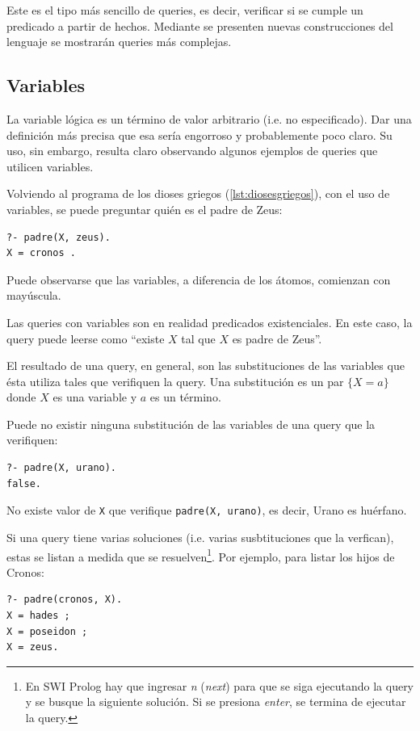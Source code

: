 \documentclass[12pt,titlepage]{article}
\begin{document}
Este es el tipo más sencillo de queries, es decir, verificar si se cumple un predicado a partir de hechos. Mediante se presenten nuevas construcciones del lenguaje se mostrarán queries más complejas.

\subsection{Variables}

La variable lógica es un término de valor arbitrario (i.e. no especificado). Dar una definición más precisa que esa sería engorroso y probablemente poco claro. Su uso, sin embargo, resulta claro observando algunos ejemplos de queries que utilicen variables.

Volviendo al programa de los dioses griegos (\ref{lst:diosesgriegos}), con el uso de variables, se puede preguntar quién es el padre de Zeus:
\begin{lstlisting}
?- padre(X, zeus).
X = cronos .
\end{lstlisting}

Puede observarse que las variables, a diferencia de los átomos, comienzan con mayúscula.

Las queries con variables son en realidad predicados existenciales. En este caso, la query puede leerse como ``existe $X$ tal que $X$ es padre de Zeus''. 

El resultado de una query, en general, son las substituciones de las variables que ésta utiliza tales que verifiquen la query. Una substitución es un par $\{X=a\}$ donde $X$ es una variable y $a$ es un término.

Puede no existir ninguna substitución de las variables de una query que la verifiquen:
\begin{lstlisting}
?- padre(X, urano).
false.
\end{lstlisting}

No existe valor de \lstinline|X| que verifique \lstinline|padre(X, urano)|, es decir, Urano es huérfano.

Si una query tiene varias soluciones (i.e. varias susbtituciones que la verfican), estas se listan a medida que se resuelven\footnote{En SWI Prolog hay que ingresar \emph{n} (\emph{next}) para que se siga ejecutando la query y se busque la siguiente solución. Si se presiona \emph{enter}, se termina de ejecutar la query.}. Por ejemplo, para listar los hijos de Cronos:
\begin{lstlisting}
?- padre(cronos, X).
X = hades ;
X = poseidon ;
X = zeus.
\end{lstlisting}
\end{document}
